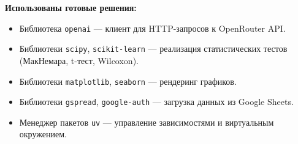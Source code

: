 \textbf{Использованы готовые решения:}
\begin{itemize}
  \item Библиотека \texttt{openai} --- клиент для HTTP-запросов к OpenRouter API.
  \item Библиотеки \texttt{scipy}, \texttt{scikit-learn} --- реализация статистических тестов (МакНемара, t-тест, Wilcoxon).
  \item Библиотеки \texttt{matplotlib}, \texttt{seaborn} --- рендеринг графиков.
  \item Библиотеки \texttt{gspread}, \texttt{google-auth} --- загрузка данных из Google Sheets.
  \item Менеджер пакетов \texttt{uv} --- управление зависимостями и виртуальным окружением.
\end{itemize}
